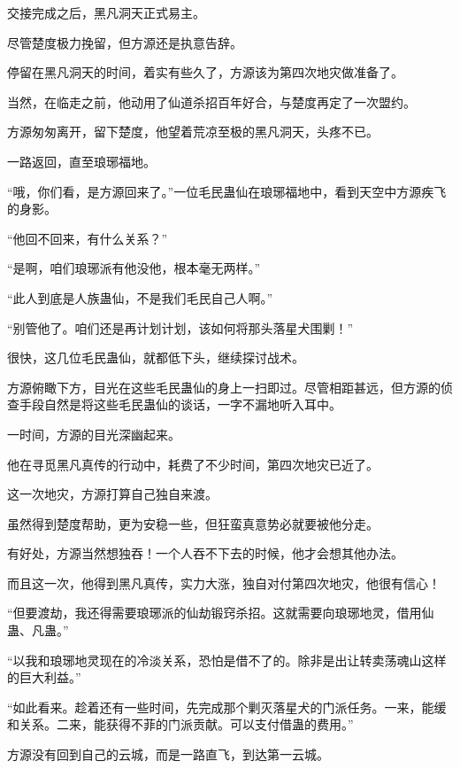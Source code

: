 
\begin{this_body}

交接完成之后，黑凡洞天正式易主。

尽管楚度极力挽留，但方源还是执意告辞。

停留在黑凡洞天的时间，着实有些久了，方源该为第四次地灾做准备了。

当然，在临走之前，他动用了仙道杀招百年好合，与楚度再定了一次盟约。

方源匆匆离开，留下楚度，他望着荒凉至极的黑凡洞天，头疼不已。

一路返回，直至琅琊福地。

“哦，你们看，是方源回来了。”一位毛民蛊仙在琅琊福地中，看到天空中方源疾飞的身影。

“他回不回来，有什么关系？”

“是啊，咱们琅琊派有他没他，根本毫无两样。”

“此人到底是人族蛊仙，不是我们毛民自己人啊。”

“别管他了。咱们还是再计划计划，该如何将那头落星犬围剿！”

很快，这几位毛民蛊仙，就都低下头，继续探讨战术。

方源俯瞰下方，目光在这些毛民蛊仙的身上一扫即过。尽管相距甚远，但方源的侦查手段自然是将这些毛民蛊仙的谈话，一字不漏地听入耳中。

一时间，方源的目光深幽起来。

他在寻觅黑凡真传的行动中，耗费了不少时间，第四次地灾已近了。

这一次地灾，方源打算自己独自来渡。

虽然得到楚度帮助，更为安稳一些，但狂蛮真意势必就要被他分走。

有好处，方源当然想独吞！一个人吞不下去的时候，他才会想其他办法。

而且这一次，他得到黑凡真传，实力大涨，独自对付第四次地灾，他很有信心！

“但要渡劫，我还得需要琅琊派的仙劫锻窍杀招。这就需要向琅琊地灵，借用仙蛊、凡蛊。”

“以我和琅琊地灵现在的冷淡关系，恐怕是借不了的。除非是出让转卖荡魂山这样的巨大利益。”

“如此看来。趁着还有一些时间，先完成那个剿灭落星犬的门派任务。一来，能缓和关系。二来，能获得不菲的门派贡献。可以支付借蛊的费用。”

方源没有回到自己的云城，而是一路直飞，到达第一云城。


\end{this_body}
